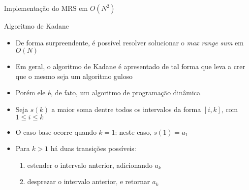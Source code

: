 \begin{frame}[fragile]{Implementação do MRS em $O(N^2)$}
\end{frame}

\begin{frame}[fragile]{Algoritmo de Kadane}

    \begin{itemize}
        \item De forma surpreendente, é possível resolver solucionar o \textit{max range sum} em
            $O(N)$

        \item Em geral, o algoritmo de Kadane é apresentado de tal forma que leva a crer que o 
            mesmo seja um algoritmo guloso

        \item Porém ele é, de fato, um algoritmo de programação dinâmica

        \item Seja $s(k)$ a maior soma dentre todos os intervalos da forma $[i, k]$, com 
            $1\leq i\leq k$

        \item O caso base ocorre quando $k = 1$: neste caso, $s(1) = a_1$

        \item Para $k > 1$ há duas transições possíveis:
        \begin{enumerate}
            \item estender o intervalo anterior, adicionando $a_k$
            \item desprezar o intervalo anterior, e retornar $a_k$
        \end{enumerate}
    \end{itemize}

\end{frame}

